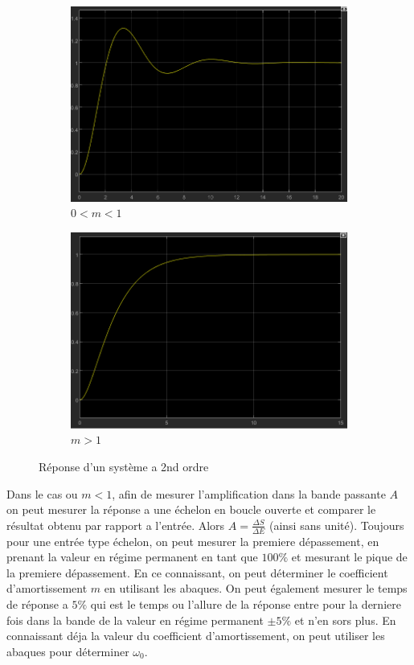 \documentclass[12pt, a4paper]{report}
\begin{document}
\begin{figure}[h]
    \begin{subfigure}[h!]{0.4\linewidth}
    \includegraphics[width=\linewidth]{reponse2ndordresmallz.png}
    \caption{$0 < m < 1$}
    \end{subfigure}
    \hfill
    \begin{subfigure}[h!]{0.4\linewidth}
    \includegraphics[width=\linewidth]{reponse2ndordrebigz.png}
    \caption{$m > 1$}
    \end{subfigure}
    \caption{Réponse d'un système a 2nd ordre}
\end{figure}

Dans le cas ou $m < 1$, afin de mesurer l'amplification dans la bande passante $A$ on peut mesurer
la réponse a une échelon en boucle ouverte et comparer le résultat obtenu par rapport a l'entrée. Alors $A = \frac{\Delta S}{\Delta E}$ (ainsi sans unité).
Toujours pour une entrée type échelon, on peut mesurer la premiere dépassement, en prenant la valeur en régime permanent en tant que $100\%$ 
et mesurant le pique de la premiere dépassement. En ce connaissant, on peut déterminer le coefficient d'amortissement $m$ en utilisant les abaques.
On peut également mesurer le temps de réponse a $5\%$ qui est le temps ou l'allure de la réponse entre pour la derniere fois dans la bande
de la valeur en régime permanent $\pm 5\%$ et n'en sors plus. En connaissant déja la valeur du coefficient d'amortissement, on peut utiliser les abaques pour 
déterminer $\omega_0$.
\end{document}
